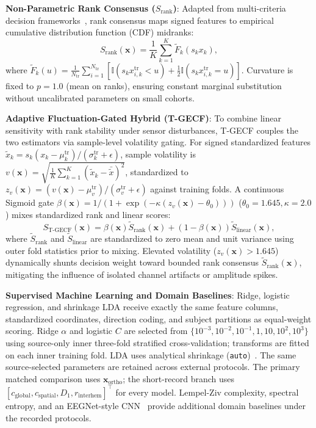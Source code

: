 \documentclass[journal,twoside,web]{ieeecolor}
\begin{document}
\textbf{Non-Parametric Rank Consensus ($S_{\text{rank}}$)}:
Adapted from multi-criteria decision frameworks~\cite{grabisch2009aggregation}, rank consensus maps signed features to empirical cumulative distribution function (CDF) midranks:
\begin{equation}
S_{\text{rank}}(\mathbf{x}) = \frac{1}{K} \sum_{k=1}^K \tilde{F}_k(s_k x_k),
\end{equation}
where $\tilde{F}_k(u) = \frac{1}{N_{\text{tr}}} \sum_{i=1}^{N_{\text{tr}}} [ \mathbb{I}(s_k x_{i, k}^{\text{tr}} < u) + \frac{1}{2} \mathbb{I}(s_k x_{i, k}^{\text{tr}} = u) ]$. Curvature is fixed to $p = 1.0$ (mean on ranks), ensuring constant marginal substitution without uncalibrated parameters on small cohorts.

\textbf{Adaptive Fluctuation-Gated Hybrid (T-GECF)}:
To combine linear sensitivity with rank stability under sensor disturbances, T-GECF couples the two estimators via sample-level volatility gating. For signed standardized features $\tilde{x}_k = s_k (x_k - \mu_k^{\text{tr}})/(\sigma_k^{\text{tr}} + \epsilon)$, sample volatility is $v(\mathbf{x}) = \sqrt{\frac{1}{K} \sum_{k=1}^K (\tilde{x}_k - \bar{\tilde{x}})^2}$, standardized to $z_v(\mathbf{x}) = (v(\mathbf{x}) - \mu_v^{\text{tr}})/(\sigma_v^{\text{tr}} + \epsilon)$ against training folds. A continuous Sigmoid gate $\beta(\mathbf{x}) = 1 / (1 + \exp(-\kappa(z_v(\mathbf{x}) - \theta_0)))$ ($\theta_0 = 1.645, \kappa = 2.0$) mixes standardized rank and linear scores:
\begin{equation}
S_{\text{T-GECF}}(\mathbf{x}) = \beta(\mathbf{x}) \tilde{S}_{\text{rank}}(\mathbf{x}) + (1 - \beta(\mathbf{x})) \tilde{S}_{\text{linear}}(\mathbf{x}),
\end{equation}
where $\tilde{S}_{\text{rank}}$ and $\tilde{S}_{\text{linear}}$ are standardized to zero mean and unit variance using outer fold statistics prior to mixing. Elevated volatility ($z_v(\mathbf{x}) > 1.645$) dynamically shunts decision weight toward bounded rank consensus $\tilde{S}_{\text{rank}}(\mathbf{x})$, mitigating the influence of isolated channel artifacts or amplitude spikes.

\textbf{Supervised Machine Learning and Domain Baselines}:
Ridge, logistic regression, and shrinkage LDA receive exactly the same feature columns, standardized coordinates, direction coding, and subject partitions as equal-weight scoring. Ridge $\alpha$ and logistic $C$ are selected from $\{10^{-3},10^{-2},10^{-1},1,10,10^2,10^3\}$ using source-only inner three-fold stratified cross-validation; transforms are fitted on each inner training fold. LDA uses analytical shrinkage (\texttt{auto})~\cite{ledoit2004well}. The same source-selected parameters are retained across external protocols. The primary matched comparison uses $\mathbf{x}_{\text{ortho}}$; the short-record branch uses $[c_{\text{global}},c_{\text{spatial}},D_1,r_{\text{interhem}}]^\top$ for every model. Lempel-Ziv complexity, spectral entropy, and an EEGNet-style CNN~\cite{lawhern2018eegnet} provide additional domain baselines under the recorded protocols.
\end{document}
